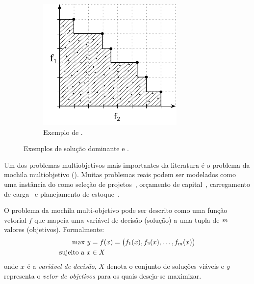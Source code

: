\begin{figure}
\begin{subfigure}[t]{0.3\textwidth}
        \includegraphics[width=\textwidth]{img/mokp/pareto-def}
        \caption{Exemplo de \paretoset.}
        \label{fig:eff-def}
    \end{subfigure}
    \caption{Exemplos de solução dominante e \paretoset.}
    \label{fig:mo-defs}
\end{figure}


Um dos problemas multiobjetivos mais importantes da literatura
é o problema da mochila multiobjetivo (\mokp{}).
Muitas problemas reais podem ser modelados como uma instância do \mokp{}
como seleção de projetos~\cite{teng1996multiobjective},
orçamento de capital~\cite{rosenblatt1989generating},
carregamento de carga~\cite{teng1996multiobjective}
e planejamento de estoque~\cite{ishibuchi2015behavior}.


O problema da mochila multi-objetivo pode ser descrito como uma função vetorial
$f$ que mapeia uma variável de decisão (solução) a uma tupla de $m$ valores
(objetivos).
Formalmente:
\begin{align*}
  \text{max} ~ y &= f(x) =
    \big(f_1(x)
    ,f_2(x)
    ,\ldots
    ,f_{m}(x)\big) \\
  \text{sujeito a} ~ x & \in X
\end{align*}
onde $x$ é a \emph{variável de decisão}, $X$ denota o conjunto de
soluções viáveis e $y$ representa o \emph{vetor de objetivos} para os quais
deseja-se maximizar.

